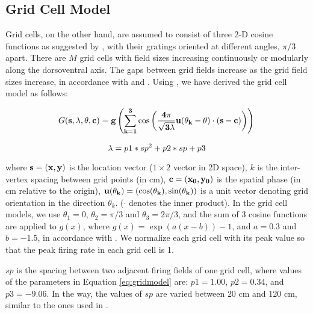 \documentclass[11pt, letterpaper, onecolumn]{article}
\begin{document}
\subsection{Grid Cell Model}
Grid cells, on the other hand, are assumed to consist of three 2-D cosine functions as suggested by \cite{Solstad:From06}, with their gratings oriented at different angles, $ \pi/3 $ apart. There are $M$ grid cells with field sizes increasing continuously or modularly along the dorsoventral axis. The gaps between grid fields increase as the grid field sizes increase, in  accordance with \cite{Brun:Progressive08} and \cite{Hafting:Microstructure05}. Using \cite{Lyttle:Spatial13}, we have derived the grid cell model as follows:

\begin{equation}
\label{eq:gridmodel}
G(\bf{s}, \lambda, \theta, \bf{c}) = g\left(\sum_{k=1}^{3} \cos\left(\frac{4\pi}{\sqrt{3\lambda}}\bf{u}(\theta_{k}-\theta)\cdot(\bf{s}-\bf{c})\right)\right) \\
\end{equation}

\begin{equation*}
    \label{eq:sp}
    \lambda = p1*sp^2+ p2*sp + p3 \\
\end{equation*}

where $ \bf{s}=(x,y)$ is the location vector ($1\times 2$ vector in 2D space), $ k $ is the inter-vertex spacing between grid points (in cm), $ \bf{c} = (x_{0},y_{0}) $ is the spatial phase (in cm relative to the origin), $ \bf{u}(\theta_{k})=(\cos(\theta_{k}), \sin(\theta_{k}))$ is a unit vector denoting grid orientation in the direction $ \theta_{k} $. ($\cdot$ denotes the inner product). In the grid cell models, we use $ \theta_{1} = 0 $, $ \theta_{2} = \pi/3 $ and $ \theta_{3} = 2\pi/3 $, and the sum of 3 cosine functions are applied to $ g(x) $, where $ g(x) = \exp(a(x-b))-1 $, and $ a=0.3 $ and $ b=-1.5 $, in accordance with \cite{Almeida:input09}. We normalize each grid cell with its peak value so that the peak firing rate in each grid cell is 1. 

$sp$ is the spacing between two adjacent firing fields of one grid cell, where values of the parameters in Equation \eqref{eq:gridmodel} are: $p1=1.00$, $p2 = 0.34$, and $p3 = -9.06$. In the way, the values of $sp$ are varied between $20$ cm and $120$ cm, similar to the ones used in \cite{Moser:Grid14}.
\end{document}
